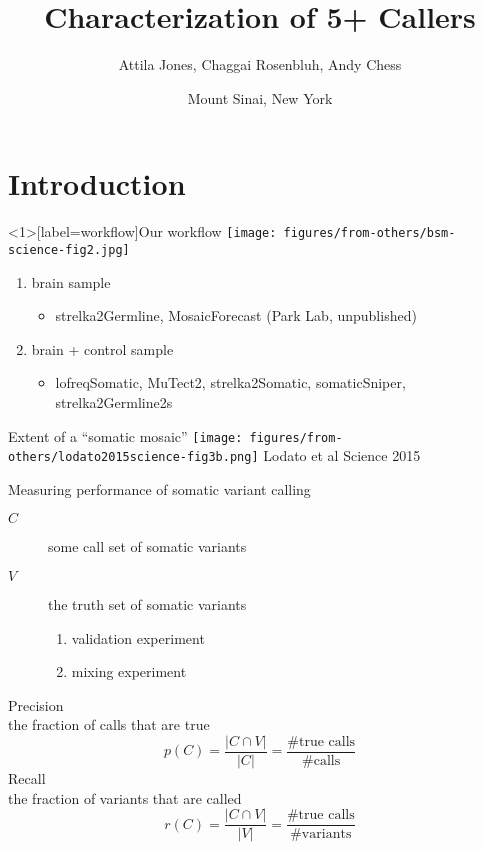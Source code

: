 \documentclass{beamer}
\title{Characterization of 5+ Callers}
\author{Attila Jones, Chaggai Rosenbluh, Andy Chess}
\date{Mount Sinai, New York}
\begin{document}
\maketitle

\section{Introduction}

\begin{frame}<1>[label=workflow]{Our workflow}
\texttt{[image: figures/from-others/bsm-science-fig2.jpg]}
\small
\begin{enumerate}
\item brain sample
\begin{itemize}
\item strelka2Germline, MosaicForecast (Park Lab, unpublished)
\end{itemize}
\item<2> brain + control sample
\begin{itemize}
\item lofreqSomatic, MuTect2, strelka2Somatic, somaticSniper,
strelka2Germline2s
\end{itemize}
\end{enumerate}
\end{frame}


\begin{frame}{Extent of a ``somatic mosaic''}
\texttt{[image: figures/from-others/lodato2015science-fig3b.png]}
\vfill
\tiny{Lodato et al Science 2015}
\end{frame}


\begin{frame}[label=precrecall]{Measuring performance of somatic variant calling}
\begin{description}
\item [\(C\)] some call set of somatic variants
\item [\(V\)] the truth set of somatic variants
\begin{enumerate}
\item validation experiment
\item mixing experiment
\end{enumerate}
\end{description}
\vfill
\alert{Precision}\\
the fraction of calls that are true
\begin{equation}
p(C) = \frac{|C \cap V|}{|C|} = \frac{\#\text{true calls}}{\#\mathrm{calls}}
\end{equation}
\alert{Recall}\\
the fraction of variants that are called
\begin{equation}
r(C) = \frac{|C \cap V|}{|V|} = \frac{\#\text{true calls}}{\#\mathrm{variants}}
\end{equation}
\end{frame}
\end{document}
